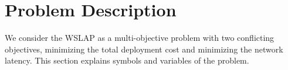 \documentclass[10pt,journal,compsoc]{IEEEtran}
\begin{document}



\section{Problem Description} \label{sec:prelimminary}

We consider the WSLAP as a multi-objective problem with two conflicting objectives, minimizing the total deployment cost and minimizing the network latency. This section explains symbols and variables of the problem.
\end{document}
